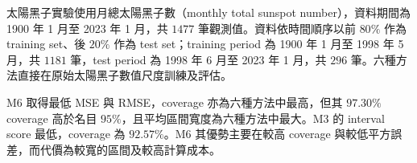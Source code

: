 {太陽黑子實驗使用月總太陽黑子數（monthly total sunspot number），資料期間為 1900 年 1 月至 2023 年 1 月，共 $1477$ 筆觀測值。資料依時間順序以前 $80\%$ 作為 training set、後 $20\%$ 作為 test set；training period 為 1900 年 1 月至 1998 年 5 月，共 $1181$ 筆，test period 為 1998 年 6 月至 2023 年 1 月，共 $296$ 筆。六種方法直接在原始太陽黑子數值尺度訓練及評估。

\begin{table}[htbp]
\centering
\caption{月總太陽黑子數：原始超參數之點預測與區間預測比較}
\label{tab:sunspot-original}
\end{table}

M6 取得最低 MSE 與 RMSE，coverage 亦為六種方法中最高，但其 $97.30\%$ coverage 高於名目 $95\%$，且平均區間寬度為六種方法中最大。M3 的 interval score 最低，coverage 為 $92.57\%$。M6 其優勢主要在較高 coverage 與較低平方誤差，而代價為較寬的區間及較高計算成本。





\iftoggle{toc-use-cn} %
{\addcontentsline{toc}{chapter}{參考文獻}
\renewcommand{\bibname}{參考文獻}} 
{\addcontentsline{toc}{chapter}{References}
\renewcommand{\bibname}{References}
} 

}
